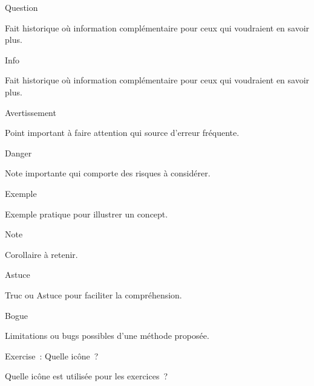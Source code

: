 \documentclass[11pt,a4paper,twoside]{book}
\begin{document}
\begin{callout}{Question}


  Fait historique où information complémentaire pour ceux qui voudraient en savoir plus.


  \end{callout}
\begin{callout}{Info}


Fait historique où information complémentaire pour ceux qui voudraient en savoir plus.


\end{callout}
\begin{callout}{Avertissement}


Point important à faire attention qui source d'erreur fréquente.


\end{callout}
\begin{callout}{Danger}


Note importante qui comporte des risques à considérer.


\end{callout}
\begin{callout}{Exemple}


Exemple pratique pour illustrer un concept.


\end{callout}
\begin{callout}{Note}


Corollaire à retenir.


\end{callout}
\begin{callout}{Astuce}


Truc ou Astuce pour faciliter la compréhension.


\end{callout}
\begin{callout}{Bogue}


Limitations ou bugs possibles d'une méthode proposée.


\end{callout}
\begin{callout}{Exercise~: Quelle icône~?}


Quelle icône est utilisée pour les exercices~?


\end{callout}
\end{document}
